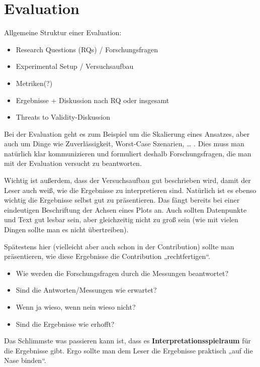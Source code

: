 
\chapter{Evaluation}\label{chapter:evaluation}

Allgemeine Struktur einer Evaluation:
\begin{itemize}
	\item Research Questions (RQs) / Forschungsfragen
	\item Experimental Setup / Versuchsaufbau
	\item Metriken(?)
	\item Ergebnisse + Diskussion nach RQ oder insgesamt
	\item Threats to Validity-Diskussion
\end{itemize}
Bei der Evaluation geht es zum Beispiel um die Skalierung eines Ansatzes, aber auch um Dinge wie Zuverlässigkeit, Worst-Case Szenarien, … .
Dies muss man natürlich klar kommunizieren und formuliert deshalb Forschungsfragen, die man mit der Evaluation versucht zu beantworten.

Wichtig ist außerdem, dass der Versuchsaufbau gut beschrieben wird, damit der Leser auch weiß, wie die Ergebnisse zu interpretieren sind. 
Natürlich ist es ebenso wichtig die Ergebnisse selbst gut zu präsentieren. 
Das fängt bereits bei einer eindeutigen Beschriftung der Achsen eines Plots an. 
Auch sollten Datenpunkte und Text gut lesbar sein, aber gleichzeitig nicht zu groß sein (wie mit vielen Dingen sollte man es nicht übertreiben).

Spätestens hier (vielleicht aber auch schon in der Contribution) sollte man präsentieren, wie diese Ergebnisse die Contribution „rechtfertigen“. 
\begin{itemize}
	\item Wie werden die Forschungsfragen durch die Messungen beantwortet?
	\item Sind die Antworten/Messungen wie erwartet?
	\item Wenn ja wieso, wenn nein wieso nicht?
	\item Sind die Ergebnisse wie erhofft?
\end{itemize}
Das Schlimmste was passieren kann ist, dass es \textbf{Interpretationsspielraum} für die Ergebnisse gibt. Ergo sollte man dem Leser die Ergebnisse praktisch „auf die Nase binden“.
